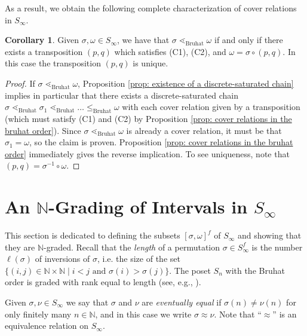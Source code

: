 \documentclass[oneside,11pt,reqno]{amsart}
\newcommand{\nn}{\ensuremath{\mathbb{N}}}
\theoremstyle{definition}
\newtheorem{proof techniques}{Proof Techniques}
\newtheorem{corollary}{Corollary}
\begin{document}
As a result, we obtain the following complete characterization of cover relations in $S_\infty$. 

\begin{corollary}\label{cor: cover relations in S infinity are given by transpositions}
    Given $\sigma , \omega \in S_\infty$, we have that $\sigma \lessdot_\text{Bruhat} \omega$ if and only if there exists a transposition $(p , q)$ which satisfies (C1), (C2), and $\omega = \sigma \circ (p , q)$. In this case the transposition $(p , q)$ is unique. 
\end{corollary}

\begin{proof}
    If $\sigma \lessdot_\text{Bruhat} \omega$, Proposition \ref{prop: existence of a discrete-saturated chain} implies in particular that there exists a discrete-saturated chain $\sigma \lessdot_\text{Bruhat} \sigma_1 \lessdot_\text{Bruhat} \ldots \leq_\text{Bruhat} \omega$ with each cover relation given by a transposition (which must satisfy (C1) and (C2) by Proposition \ref{prop: cover relations in the bruhat order}). Since $\sigma \lessdot_\text{Bruhat} \omega$ is already a cover relation, it must be that $\sigma_1 = \omega$, so the claim is proven. Proposition \ref{prop: cover relations in the bruhat order} immediately gives the reverse implication. 
    To see uniqueness, note that $(p , q) = \sigma^{-1} \circ \omega$. 
\end{proof}


\section{An $\nn$-Grading of Intervals in $S_\infty$}\label{sec: An N Grading of S infty}

This section is dedicated to defining the subsets $[\sigma , \omega]^f$ of $S_\infty$ and showing that they are $\nn$-graded. Recall that the \emph{length} of a permutation $\sigma \in S_\infty^f$ is the number $\ell(\sigma)$ of inversions of $\sigma$, i.e. the size of the set $\{(i , j) \in \nn \times \nn \mid i < j \text{ and } \sigma(i) > \sigma(j)\}$. The poset $S_n$ with the Bruhat order is graded with rank equal to length (see, e.g., \cite{bjorner2005combinatorics}). 

Given $\sigma, \nu \in S_\infty$ we say that $\sigma$ and $\nu$ are \emph{eventually equal} if $\sigma(n) \neq \nu(n)$ for only finitely many $n \in \nn$, and in this case we write $\sigma \approx \nu$. Note that ``$\approx$'' is an equivalence relation on $S_\infty$. 
\end{document}
